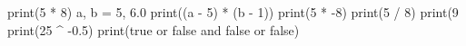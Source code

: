 print(5 * 8)
a, b = 5, 6.0
print((a - 5) * (b - 1))
print(5 * -8)
print(5 / 8)
print(9 %
print(25 ^ -0.5)
print(true or false and false or false)